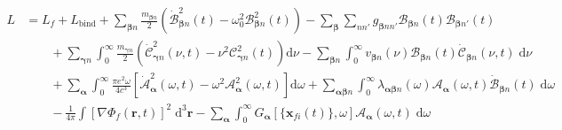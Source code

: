 \documentclass{article}
\begin{document}
\begin{equation}
\begin{split}
L &= 
L_f + L_\mathrm{bind} + \sum_{\bm{\beta}n}\frac{m_{\bm{\beta}n}}{2}\left(\dot{\mathcal{B}}_{\bm{\beta}n}^2(t) - \omega_0^2\mathcal{B}_{\bm{\beta}n}^2(t)\right) - \sum_{\bm{\beta}}\sum_{nn'}g_{\bm{\beta}nn'}\mathcal{B}_{\bm{\beta}n}(t)\mathcal{B}_{\bm{\beta}n'}(t)\\
&\qquad+ \sum_{\bm{\gamma}n}\int_0^\infty\frac{m_{\bm{\gamma}n}}{2}\left(\dot{\mathcal{C}}_{\bm{\gamma}n}^2(\nu,t) - \nu^2\mathcal{C}_{\bm{\gamma}n}^2(t)\right)\mathrm{d}\nu - \sum_{\bm{\beta}n}\int_0^\infty v_{\bm{\beta}n}(\nu)\mathcal{B}_{\bm{\beta}n}(t)\dot{\mathcal{C}}_{\bm{\beta}n}(\nu,t)\;\mathrm{d}\nu\\
&\qquad + \sum_{\bm{\alpha}}\int_0^\infty\frac{\pi e^2\omega}{4c^3}\left[\dot{\mathcal{A}}_{\bm{\alpha}}^2(\omega,t) - \omega^2\mathcal{A}_{\bm{\alpha}}^2(\omega,t)\right]\mathrm{d}\omega + \sum_{\bm{\alpha}\bm{\beta}n}\int_0^\infty\lambda_{\bm{\alpha}\bm{\beta}n}(\omega)\mathcal{A}_{\bm{\alpha}}(\omega,t)\dot{\mathcal{B}}_{\bm{\beta}n}(t)\;\mathrm{d}\omega\\
&\qquad - \frac{1}{4\pi}\int\left[\nabla\Phi_f(\mathbf{r},t)\right]^2\;\mathrm{d}^3\mathbf{r} - \sum_{\bm{\alpha}}\int_0^\infty G_{\bm{\alpha}}[\{\mathbf{x}_{fi}(t)\},\omega]\mathcal{A}_{\bm{\alpha}}(\omega,t)\;\mathrm{d}\omega
\end{split}
\end{equation}
\end{document}
